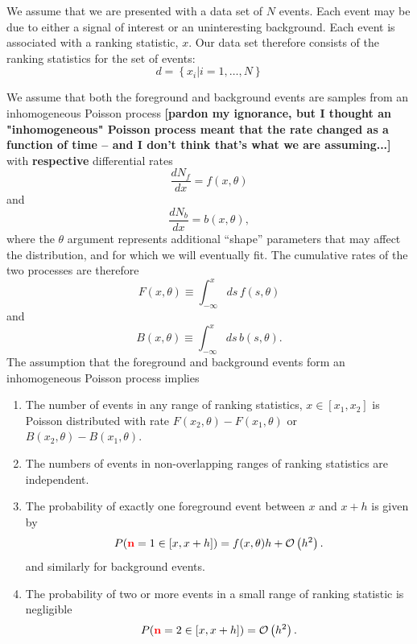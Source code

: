 \documentclass[aps,prd]{revtex4-1}
\newcommand{\order}[1]{\mathcal{O}\left( #1 \right)}
\newcommand{\mathset}[1]{\left\{ #1 \right\}}
\newcommand{\ilya}[1]{{\color{red} \bf #1}}
\begin{document}
We assume that we are presented with a data set of $N$ events.  Each
event may be due to either a signal of interest or an uninteresting
background.  Each event is associated with a ranking statistic, $x$.
Our data set therefore consists of the ranking statistics for the set
of events:
\begin{equation}
  d = \mathset{ x_i | i = 1, \ldots, N }
\end{equation}

We assume that both the foreground and background events are samples
from an inhomogeneous Poisson process \ilya{[pardon my ignorance, but I thought an "inhomogeneous" Poisson process meant that the rate changed as a function of time -- and I don't think that's what we are assuming...]} with \ilya{respective} differential rates
\begin{equation}
  \frac{dN_f}{dx} = f(x, \theta)
\end{equation}
and 
\begin{equation}
  \frac{dN_b}{dx} = b(x, \theta),
\end{equation}
where the $\theta$ argument represents additional ``shape'' parameters
that may affect the distribution, and for which we will eventually
fit.  The cumulative rates of the two processes are therefore
\begin{equation}
  F(x,\theta) \equiv \int_{-\infty}^x ds\, f(s, \theta)
\end{equation}
and
\begin{equation}
  B(x,\theta) \equiv \int_{-\infty}^x ds\, b(s,\theta).
\end{equation}
The assumption that the foreground and background events form an
inhomogeneous Poisson process implies
\begin{enumerate}
\item \label{prop:Poisson} The number of events in any range of
  ranking statistics, $x \in [x_1, x_2]$ is Poisson distributed with
  rate $F(x_2, \theta) - F(x_1,\theta)$ or $B(x_2,\theta) -
  B(x_1,\theta)$.
\item The numbers of events in non-overlapping ranges of ranking
  statistics are independent. 
\item The probability of exactly one foreground event between $x$ and
  $x+h$ is given by
  \begin{equation}
    P(\ilya{n} = 1 \in [x, x+h]) = f(x,\theta) h + \order{h^2}.
  \end{equation}
  and similarly for background events.
\item The probability of two or more events in a small range of
  ranking statistic is negligible
  \begin{equation}
    P(\ilya{n} = 2 \in [x, x+h]) = \order{h^2}.
  \end{equation}
\end{enumerate}
\end{document}
